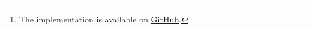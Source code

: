 \begin{abstract}
    \begin{center}
        Following \cite{Nakatsukasa2022}, this report briefly presents some results in randomized numerical linear algebra to discuss the theory of the Sketched \textit{GMRES} method and its implementation\footnote{The implementation is available on \href{https://github.com/diantonioandrea/NASS}{GitHub}.}.
    \end{center}
\end{abstract}